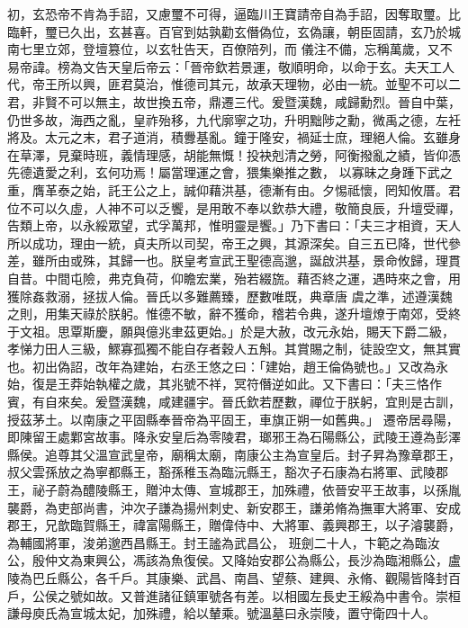 \begin{pinyinscope}
 初，玄恐帝不肯為手詔，又慮璽不可得，逼臨川王寶請帝自為手詔，因奪取璽。比臨軒，璽已久出，玄甚喜。百官到姑孰勸玄僭偽位，玄偽讓，朝臣固請，玄乃於城南七里立郊，登壇篡位，以玄牡告天，百僚陪列，而
 儀注不備，忘稱萬歲，又不易帝諱。榜為文告天皇后帝云：「晉帝欽若景運，敬順明命，以命于玄。夫天工人代，帝王所以興，匪君莫治，惟德司其元，故承天理物，必由一統。並聖不可以二君，非賢不可以無主，故世換五帝，鼎遷三代。爰暨漢魏，咸歸勳烈。晉自中葉，仍世多故，海西之亂，皇祚殆移，九代廓寧之功，升明黜陟之勳，微禹之德，左衽將及。太元之末，君子道消，積釁基亂。鐘于隆安，禍延士庶，理絕人倫。玄雖身在草澤，見棄時班，義情理感，胡能無慨！投袂剋清之勞，阿衡撥亂之績，皆仰憑先德遺愛之利，玄何功焉！屬當理運之會，猥集樂推之數，
 以寡昧之身踵下武之重，膺革泰之始，託王公之上，誠仰藉洪基，德漸有由。夕惕祗懷，罔知攸厝。君位不可以久虛，人神不可以乏饗，是用敢不奉以欽恭大禮，敬簡良辰，升壇受禪，告類上帝，以永綏眾望，式孚萬邦，惟明靈是饗。」乃下書曰：「夫三才相資，天人所以成功，理由一統，貞夫所以司契，帝王之興，其源深矣。自三五已降，世代參差，雖所由或殊，其歸一也。朕皇考宣武王聖德高邈，誕啟洪基，景命攸歸，理貫自昔。中間屯險，弗克負荷，仰瞻宏業，殆若綴旒。藉否終之運，遇時來之會，用獲除姦救溺，拯拔人倫。晉氏以多難薦臻，歷數唯既，典章唐
 虞之準，述遵漢魏之則，用集天祿於朕躬。惟德不敏，辭不獲命，稽若令典，遂升壇燎于南郊，受終于文祖。思覃斯慶，願與億兆聿茲更始。」於是大赦，改元永始，賜天下爵二級，孝悌力田人三級，鰥寡孤獨不能自存者穀人五斛。其賞賜之制，徒設空文，無其實也。初出偽詔，改年為建始，右丞王悠之曰：「建始，趙王倫偽號也。」又改為永始，復是王莽始執權之歲，其兆號不祥，冥符僭逆如此。又下書曰：「夫三恪作賓，有自來矣。爰暨漢魏，咸建疆宇。晉氏欽若歷數，禪位于朕躬，宜則是古訓，授茲茅土。以南康之平固縣奉晉帝為平固王，車旗正朔一如舊典。」
 遷帝居尋陽，即陳留王處鄴宮故事。降永安皇后為零陵君，瑯邪王為石陽縣公，武陵王遵為彭澤縣侯。追尊其父溫宣武皇帝，廟稱太廟，南康公主為宣皇后。封子昇為豫章郡王，叔父雲孫放之為寧都縣王，豁孫稚玉為臨沅縣王，豁次子石康為右將軍、武陵郡王，祕子蔚為醴陵縣王，贈沖太傳、宣城郡王，加殊禮，依晉安平王故事，以孫胤襲爵，為吏部尚書，沖次子謙為揚州刺史、新安郡王，謙弟脩為撫軍大將軍、安成郡王，兄歆臨賀縣王，禕富陽縣王，贈偉侍中、大將軍、義興郡王，以子濬襲爵，為輔國將軍，浚弟邈西昌縣王。封王謐為武昌公，
 班劍二十人，卞範之為臨汝公，殷仲文為東興公，馮該為魚復侯。又降始安郡公為縣公，長沙為臨湘縣公，盧陵為巴丘縣公，各千戶。其康樂、武昌、南昌、望蔡、建興、永脩、觀陽皆降封百戶，公侯之號如故。又普進諸征鎮軍號各有差。以相國左長史王綏為中書令。崇桓謙母庾氏為宣城太妃，加殊禮，給以輦乘。號溫墓曰永崇陵，置守衛四十人。




\end{pinyinscope}
